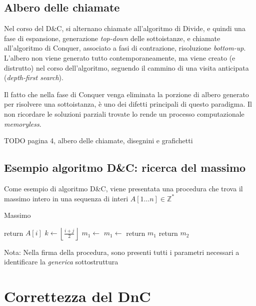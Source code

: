 \subsection{Albero delle chiamate}
Nel corso del D\&C, si alternano chiamate all'algoritmo di Divide, e quindi una fase di espansione, generazione \textit{top-down} delle sottoistanze, e chiamate all'algoritmo di Conquer, associato a fasi di contrazione, risoluzione \textit{bottom-up}. L'albero non viene generato tutto contemporaneamente, ma viene creato (e distrutto) nel corso dell'algoritmo, seguendo il cammino di una visita anticipata (\textit{depth-first search}).

Il fatto che nella fase di Conquer venga eliminata la porzione di albero generato per risolvere una sottoistanza, è uno dei difetti principali di questo paradigma. Il non ricordare le soluzioni parziali trovate lo rende un processo computazionale \textit{memoryless}.

TODO pagina 4, albero delle chiamate, disegnini e grafichetti

\subsection{Esempio algoritmo D\&C: ricerca del massimo}

Come esempio di algoritmo D\&C, viene presentata una procedura che trova il massimo intero in una sequenza di interi $A[1 \dots n] \in \mathbb{Z}^*$

\begin{algorithm}[H]
\caption{Massimo}\label{alg:max}
\begin{algorithmic}[1]
                                     
            \State return $A[i]$
        \EndIf
        \State $k \gets \left\lfloor \frac{i+j}{2} \right\rfloor$    
        \State $m_1 \gets $  
        \State $m_1 \gets $ 
                      
            \State return $m_1$
        \Else
            \State return $m_2$
        \EndIf
    \EndProcedure
\end{algorithmic}
\end{algorithm}

Nota: Nella firma della procedura, sono presenti tutti i parametri necessari a identificare la \textit{generica} sottostruttura

\section{Correttezza del DnC}


